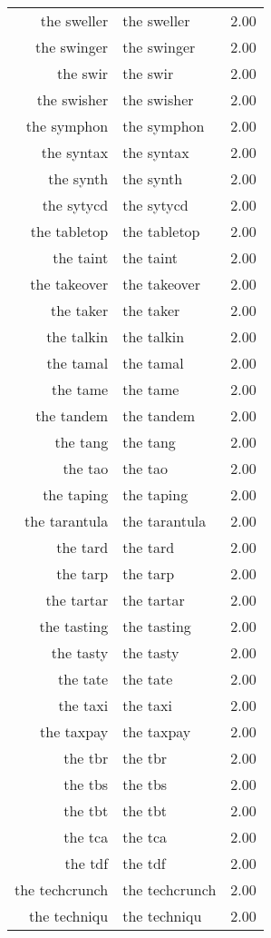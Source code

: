 \begin{table}[ht]
\begin{tabular}{rlr}
  the sweller & the sweller & 2.00 \\ 
  the swinger & the swinger & 2.00 \\ 
  the swir & the swir & 2.00 \\ 
  the swisher & the swisher & 2.00 \\ 
  the symphon & the symphon & 2.00 \\ 
  the syntax & the syntax & 2.00 \\ 
  the synth & the synth & 2.00 \\ 
  the sytycd & the sytycd & 2.00 \\ 
  the tabletop & the tabletop & 2.00 \\ 
  the taint & the taint & 2.00 \\ 
  the takeover & the takeover & 2.00 \\ 
  the taker & the taker & 2.00 \\ 
  the talkin & the talkin & 2.00 \\ 
  the tamal & the tamal & 2.00 \\ 
  the tame & the tame & 2.00 \\ 
  the tandem & the tandem & 2.00 \\ 
  the tang & the tang & 2.00 \\ 
  the tao & the tao & 2.00 \\ 
  the taping & the taping & 2.00 \\ 
  the tarantula & the tarantula & 2.00 \\ 
  the tard & the tard & 2.00 \\ 
  the tarp & the tarp & 2.00 \\ 
  the tartar & the tartar & 2.00 \\ 
  the tasting & the tasting & 2.00 \\ 
  the tasty & the tasty & 2.00 \\ 
  the tate & the tate & 2.00 \\ 
  the taxi & the taxi & 2.00 \\ 
  the taxpay & the taxpay & 2.00 \\ 
  the tbr & the tbr & 2.00 \\ 
  the tbs & the tbs & 2.00 \\ 
  the tbt & the tbt & 2.00 \\ 
  the tca & the tca & 2.00 \\ 
  the tdf & the tdf & 2.00 \\ 
  the techcrunch & the techcrunch & 2.00 \\ 
  the techniqu & the techniqu & 2.00 \\ 

\end{tabular}
\end{table}
